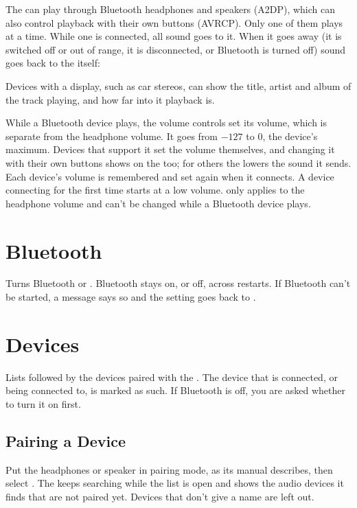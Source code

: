 The \dap{} can play through Bluetooth headphones and speakers (A2DP),
which can also control playback with their own buttons (AVRCP). Only one
of them plays at a time. While one is connected, all sound goes to it.
When it goes away (it is switched off or out of range, it is disconnected,
or Bluetooth is turned off) sound goes back to the \dap{} itself:

Devices with a display, such as car stereos, can show the title, artist
and album of the track playing, and how far into it playback is.

While a Bluetooth device plays, the volume controls set its volume, which
is separate from the headphone volume. It goes from $-127$ to 0, the
device's maximum. Devices that support it set the volume themselves, and
changing it with their own buttons shows on the \dap{} too; for others
the \dap{} lowers the sound it sends. Each device's volume is remembered
and set again when it connects. A device connecting for the first time
starts at a low volume.  only applies to the
headphone volume and can't be changed while a Bluetooth device plays.

\section{Bluetooth}
Turns Bluetooth  or . Bluetooth stays on, or off,
across restarts. If Bluetooth can't be started, a message says so and the
setting goes back to .

\section{\label{ref:BluetoothDevices}Devices}
Lists  followed by the devices paired with
the \dap{}. The device that is connected, or being connected to, is marked
as such. If Bluetooth is off, you are asked whether to turn it on first.

\subsection{Pairing a Device}
Put the headphones or speaker in pairing mode, as its manual describes,
then select . The \dap{} keeps searching while
the list is open and shows the audio devices it finds that are not paired
yet. Devices that don't give a name are left out.

